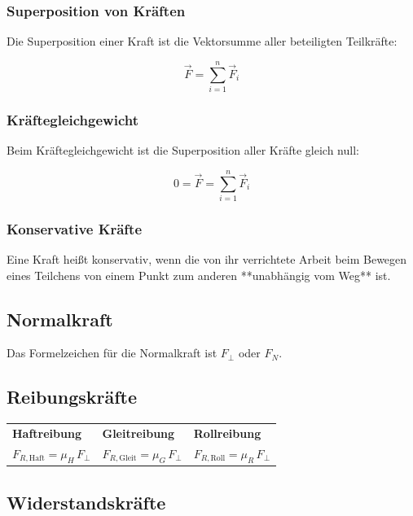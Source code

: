 \documentclass[10pt,a4paper]{article}
\begin{document}
		\subsubsection{Superposition von Kräften}
		Die Superposition einer Kraft ist die Vektorsumme aller beteiligten Teilkräfte:
		
		\[
		\vec{F} = \sum_{i=1}^{n} \vec{F}_i
		\]
		
		\subsubsection{Kräftegleichgewicht}
		Beim Kräftegleichgewicht ist die Superposition aller Kräfte gleich null:
		
		\[
		0 = \vec{F} = \sum_{i=1}^{n} \vec{F}_i
		\]
		
		\subsubsection{Konservative Kräfte}
		Eine Kraft heißt konservativ, wenn die von ihr verrichtete Arbeit beim Bewegen eines Teilchens
		von einem Punkt zum anderen **unabhängig vom Weg** ist.
		
		\subsection{Normalkraft}
		Das Formelzeichen für die Normalkraft ist 
		\(F_{\perp}\) oder \(F_N\).
		
		\subsection{Reibungskräfte}
		
		\begin{tabular}{p{} p{} p{}}
			
			\textbf{Haftreibung} &
			\textbf{Gleitreibung} &
			\textbf{Rollreibung} 
			\\[6pt]
			
			$F_{R,\text{Haft}} = \mu_H\, F_{\perp}$ &
			$F_{R,\text{Gleit}} = \mu_G\, F_{\perp}$ &
			$F_{R,\text{Roll}} = \mu_R\, F_{\perp}$ 
			\\
			
		\end{tabular}
		
		\subsection{Widerstandskräfte}
		
\end{document}
